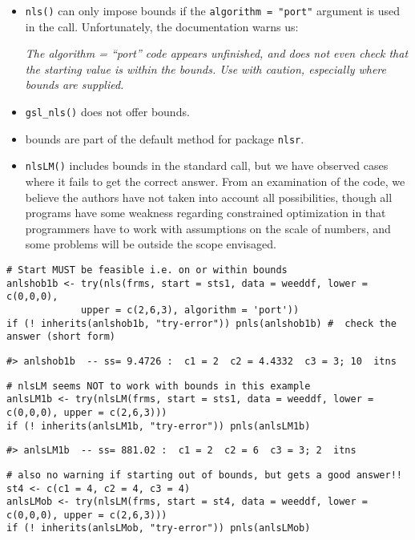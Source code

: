 \begin{itemize}
\item
  \texttt{nls()} can only impose bounds if the \texttt{algorithm\ =\ "port"} argument is
  used in the call. Unfortunately, the documentation warns us:

  \emph{The algorithm = ``port'' code appears unfinished, and does not even
  check that the starting value is within the bounds. Use with
  caution, especially where bounds are supplied.}
\item
  \texttt{gsl\_nls()} does not offer bounds.
\item
  bounds are part of the default method for package \texttt{nlsr}.
\item
  \texttt{nlsLM()} includes bounds in the standard call, but we have observed cases
  where it fails to get the correct answer. From an examination of the code,
  we believe the authors have not taken into account all possibilities, though
  all programs have some weakness regarding constrained optimization in that
  programmers have to work with assumptions on the scale of numbers,
  and some problems will be outside the scope envisaged.
\end{itemize}

\begin{verbatim}
# Start MUST be feasible i.e. on or within bounds
anlshob1b <- try(nls(frms, start = sts1, data = weeddf, lower = c(0,0,0),
             upper = c(2,6,3), algorithm = 'port'))
if (! inherits(anlshob1b, "try-error")) pnls(anlshob1b) #  check the answer (short form)
\end{verbatim}

\begin{verbatim}
#> anlshob1b  -- ss= 9.4726 :  c1 = 2  c2 = 4.4332  c3 = 3; 10  itns
\end{verbatim}

\begin{verbatim}
# nlsLM seems NOT to work with bounds in this example
anlsLM1b <- try(nlsLM(frms, start = sts1, data = weeddf, lower = c(0,0,0), upper = c(2,6,3)))
if (! inherits(anlsLM1b, "try-error")) pnls(anlsLM1b)
\end{verbatim}

\begin{verbatim}
#> anlsLM1b  -- ss= 881.02 :  c1 = 2  c2 = 6  c3 = 3; 2  itns
\end{verbatim}

\begin{verbatim}
# also no warning if starting out of bounds, but gets a good answer!!
st4 <- c(c1 = 4, c2 = 4, c3 = 4)
anlsLMob <- try(nlsLM(frms, start = st4, data = weeddf, lower = c(0,0,0), upper = c(2,6,3)))
if (! inherits(anlsLMob, "try-error")) pnls(anlsLMob)
\end{verbatim}


